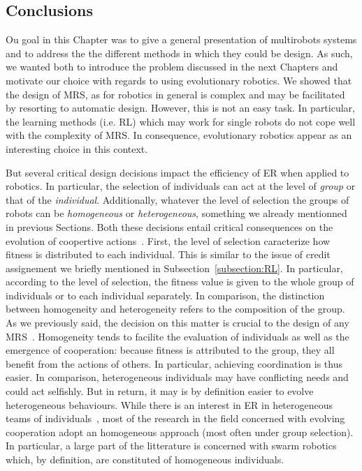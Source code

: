   \subsection{Conclusions}

    Ou goal in this Chapter was to give a general presentation of multirobots systems and to address the the different methods in which they could be design. As such, we wanted both to introduce the problem discussed in the next Chapters and motivate our choice with regards to using evolutionary robotics. We showed that the design of MRS, as for robotics in general is complex and may be facilitated by resorting to automatic design. However, this is not an easy task. In particular, the learning methods (i.e. RL) which may work for single robots do not cope well with the complexity of MRS. In consequence, evolutionary robotics appear as an interesting choice in this context.

    But several critical design decisions impact the efficiency of ER when applied to robotics. In particular, the selection of individuals can act at the level of \emph{group} or that of the \emph{individual}. Additionally, whatever the level of selection the groups of robots can be \emph{homogeneous} or \emph{heterogeneous}, something we already mentionned in previous Sections. Both these decisions entail critical consequences on the evolution of coopertive actions~\parencite{Waibel2009}. First, the level of selection caracterize how fitness is distributed to each individual. This is similar to the issue of credit assignement we briefly mentioned in Subsection~\ref{subsection:RL}. In particular, according to the level of selection, the fitness value is given to the whole group of individuals or to each individual separately. In comparison, the distinction between homogeneity and heterogeneity refers to the composition of the group. As we previously said, the decision on this matter is crucial to the design of any MRS~\parencite{Quinn2003}. Homogeneity tends to facilite the evaluation of individuals as well as the emergence of cooperation: because fitness is attributed to the group, they all benefit from the actions of others. In particular, achieving coordination is thus easier. In comparison, heterogeneous individuals may have conflicting needs and could act selfishly. But in return, it may is by definition easier to evolve heterogeneous behaviours. While there is an interest in ER in heterogeneous teams of individuals~\parencite{Lichocki2013}, most of the research in the field concerned with evolving cooperation adopt an homogeneous approach (most often under group selection). In particular, a large part of the litterature is concerned with swarm robotics which, by definition, are constituted of homogeneous individuals.

